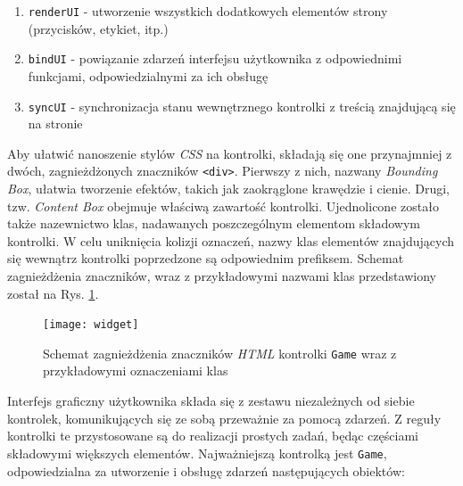 \documentclass[a4paper,12pt]{article}
\providecommand{\imref}[1]{Rys. \ref{#1}} %
\begin{document}
\begin{enumerate}
\item \texttt{renderUI} - utworzenie wszystkich dodatkowych elementów
  strony (przycisków, etykiet, itp.)
\item \texttt{bindUI} - powiązanie zdarzeń interfejsu użytkownika z
  odpowiednimi funkcjami, odpowiedzialnymi za ich obsługę
\item \texttt{syncUI} - synchronizacja stanu wewnętrznego kontrolki z
  treścią znajdującą się na stronie
\end{enumerate}

Aby ułatwić nanoszenie stylów \emph{CSS} na kontrolki, składają się
one przynajmniej z dwóch, zagnieżdżonych znaczników
\texttt{<div>}. Pierwszy z nich, nazwany \emph{Bounding Box}, ułatwia
tworzenie efektów, takich jak zaokrąglone krawędzie i cienie. Drugi,
tzw. \emph{Content Box} obejmuje właściwą zawartość
kontrolki. Ujednolicone zostało także nazewnictwo klas, nadawanych
poszczególnym elementom składowym kontrolki. W celu uniknięcia kolizji
oznaczeń, nazwy klas elementów znajdujących się wewnątrz kontrolki
poprzedzone są odpowiednim prefiksem. Schemat zagnieżdżenia
znaczników, wraz z przykładowymi nazwami klas przedstawiony został na
\imref{fig:widget}.

\begin{figure}[ht]
  \begin{center}
    \texttt{[image: widget]}
  \end{center}
  \caption{Schemat zagnieżdżenia znaczników \emph{HTML} kontrolki
    \texttt{Game} wraz z przykładowymi oznaczeniami klas}
  \label{fig:widget}
\end{figure}

Interfejs graficzny użytkownika składa się z zestawu niezależnych od
siebie kontrolek, komunikujących się ze sobą przeważnie za pomocą
zdarzeń. Z reguły kontrolki te przystosowane są do realizacji prostych
zadań, będąc częściami składowymi większych elementów. Najważniejszą
kontrolką jest \texttt{Game}, odpowiedzialna za utworzenie i obsługę
zdarzeń następujących obiektów:
\end{document}
